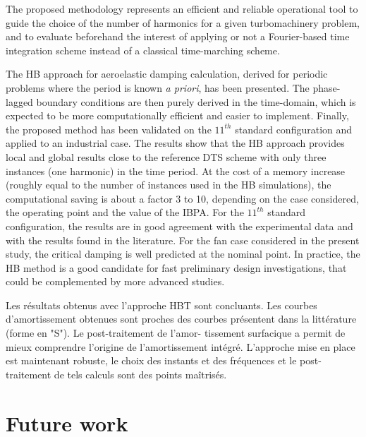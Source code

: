 The proposed methodology represents an efficient and reliable 
operational tool to guide the choice of the number of harmonics 
for a given turbomachinery problem, and to evaluate beforehand the 
interest of applying or not a Fourier-based time integration scheme 
instead of a classical time-marching scheme.


The HB approach for aeroelastic damping calculation, derived for
periodic problems where the period is known \emph{a priori}, has been
presented. 
The phase-lagged boundary conditions are then purely derived in the
time-domain, which is expected to be more computationally efficient and 
easier to implement. 
Finally, the proposed method has been
validated on the $11^{th}$ standard configuration and applied to an
industrial case. The results show that the HB approach provides local
and global results close to the reference DTS scheme with only three
instances (one harmonic) in the time period.  At the cost of a memory
increase (roughly equal to the number of instances used in the HB
simulations), the computational saving is about a factor 3 to 10,
depending on the case considered, the operating point and the value of
the IBPA. For the $11^{th}$ standard configuration, the results are
in good agreement with the experimental data and with the results
found in the literature.  For the fan case considered in the present
study, the critical damping is well predicted at the nominal point.
In practice, the HB method is a good candidate for fast preliminary
design investigations, that could be complemented by more advanced
studies.

Les résultats obtenus avec l’approche HBT sont concluants. Les courbes d’amortissement obtenues sont proches des courbes présentent dans la littérature (forme en "S"). Le post-traitement de l’amor- tissement surfacique a permit de mieux comprendre l’origine de l’amortissement intégré. L’approche mise en place est maintenant robuste, le choix des instants et des fréquences et le post-traitement de tels calculs sont des points maîtrisés.

\section*{Future work}
\label{sec:perspectives}

